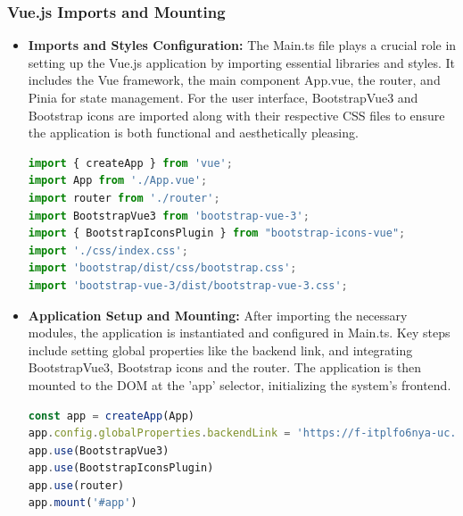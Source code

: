 \subsubsection{Vue.js Imports and Mounting}
\begin{itemize}
    \item \textbf{Imports and Styles Configuration:} The Main.ts file plays a crucial role in setting up the Vue.js application by importing essential libraries and styles. It includes the Vue framework, the main component App.vue, the router, and Pinia for state management. For the user interface, BootstrapVue3 and Bootstrap icons are imported along with their respective CSS files to ensure the application is both functional and aesthetically pleasing.
    \begin{lstlisting}[language=TypeScript]
import { createApp } from 'vue';
import App from './App.vue';
import router from './router';
import BootstrapVue3 from 'bootstrap-vue-3';
import { BootstrapIconsPlugin } from "bootstrap-icons-vue";
import './css/index.css';
import 'bootstrap/dist/css/bootstrap.css';
import 'bootstrap-vue-3/dist/bootstrap-vue-3.css';
    \end{lstlisting}

    \item \textbf{Application Setup and Mounting:} After importing the necessary modules, the application is instantiated and configured in Main.ts. Key steps include setting global properties like the backend link, and integrating BootstrapVue3, Bootstrap icons and the router. The application is then mounted to the DOM at the 'app' selector, initializing the system's frontend.
    \begin{lstlisting}[language=TypeScript]
const app = createApp(App)
app.config.globalProperties.backendLink = 'https://f-itplfo6nya-uc.a.run.app'
app.use(BootstrapVue3)
app.use(BootstrapIconsPlugin)
app.use(router)
app.mount('#app')
    \end{lstlisting}
\end{itemize}
